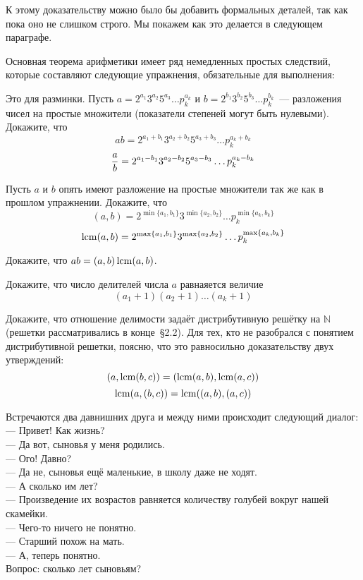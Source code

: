 К этому доказательству можно было бы добавить формальных деталей, так как пока оно не слишком строго. Мы покажем как это делается в следующем параграфе.

Основная теорема арифметики имеет ряд немедленных простых следствий, которые составляют следующие упражнения, обязательные для выполнения:

\begin{exercise}
Это для разминки. Пусть $a = 2^{a_1}3^{a_2}5^{a_3}\ldots p_k^{a_k}$ и $b = 2^{b_1}3^{b_2}5^{b_3}\ldots p_k^{b_k}$~--- разложения чисел на простые множители (показатели степеней могут быть нулевыми). Докажите, что
$$ab = 2^{a_1+b_1}3^{a_2+b_2}5^{a_3+b_3}\ldots p_k^{a_k+b_k}$$
$${a\over b} = 2^{a_1-b_1}3^{a_2-b_2}5^{a_3-b_3}\ldots p_k^{a_k-b_k}$$
\end{exercise}

\begin{exercise}
Пусть $a$ и $b$ опять имеют разложение на простые множители так же как в прошлом упражнении. Докажите, что
$$(a, b) = 2^{\min\{a_1, b_1\}} 3^{\min\{a_2, b_2\}}\ldots p_k^{\min\{a_k, b_k\}}$$
$$\operatorname{lcm}(a, b) = 2^{\max\{a_1, b_1\}} 3^{\max\{a_2, b_2\}}\ldots p_k^{\max\{a_k, b_k\}}$$
\end{exercise}

\begin{exercise}
Докажите, что $ab = (a, b) \operatorname{lcm}(a, b)$.
\end{exercise}

\begin{exercise}
Докажите, что число делителей числа $a$ равнаяется величие
$$(a_1 + 1)(a_2 + 1)\ldots(a_k + 1)$$
\end{exercise}

\begin{exercise}
Докажите, что отношение делимости задаёт дистрибутивную решётку на $\mathbb{N}$ (решетки рассматривались в конце~\S2.2). Для тех, кто не разобрался с понятием дистрибутивной решетки, поясню, что это равносильно доказательству двух утверждений:
$$(a, \operatorname{lcm}(b, c)) = (\operatorname{lcm}(a, b), \operatorname{lcm}(a, c))$$
$$\operatorname{lcm}(a, (b, c)) = \operatorname{lcm}((a, b), (a, c))$$
\end{exercise}

\begin{exercise}
Встречаются два давнишних друга и между ними происходит следующий диалог:\\
--- Привет! Как жизнь?\\
--- Да вот, сыновья у меня родились.\\
--- Ого! Давно?\\
--- Да не, сыновья ещё маленькие, в школу даже не ходят.\\
--- А сколько им лет?\\
--- Произведение их возрастов равняется количеству голубей вокруг нашей скамейки.\\
--- Чего-то ничего не понятно.\\
--- Старший похож на мать.\\
--- А, теперь понятно.\\
Вопрос: сколько лет сыновьям?
\end{exercise}

